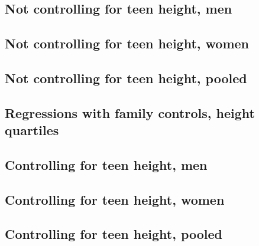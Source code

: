 \documentclass{article}
\begin{document}
\begin{landscape}
\subsection{Not controlling for teen height, men}

\end{landscape}

\begin{landscape}
\subsection{Not controlling for teen height, women}

\end{landscape}

\begin{landscape}
\subsection{Not controlling for teen height, pooled}

\end{landscape}

\begin{landscape}
\section{Regressions with family controls, height quartiles}
\subsection{Controlling for teen height, men}

\end{landscape}

\begin{landscape}
\subsection{Controlling for teen height, women}

\end{landscape}

\begin{landscape}
\subsection{Controlling for teen height, pooled}

\end{landscape}
\end{document}
